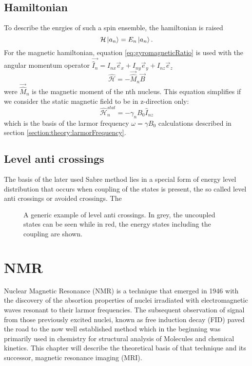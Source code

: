         \subsection{Hamiltonian}
            To describe the enrgies of such a spin ensemble, the hamiltonian is raised
            \begin{equation*}
                \mathcal{H}\ket{a_n} = E_n \ket{a_n}.
            \end{equation*}
        For the magnetic hamiltonian, equation \ref{eq:gyromagneticRatio} is used with the angular momentum operator $\vec{\hat I_n} = I_{nx}\vec e_x + I_{ny}\vec e_y + I_{nz}\vec e_z$
            \begin{equation}
                \mathcal{\hat H} = - \vec{\hat M}_n \vec B
            \end{equation}
            were $\vec{\hat M}_n$ is the magnetic moment of the nth nucleus. This equation simplifies if we consider the static magnetic field to be in z-direction only:
            \begin{equation}
                \mathcal{\hat H}_n^{stat} = - \gamma_n B_0 \hat{I}_{nz}
            \end{equation}
            which is the basis of the larmor frequency $\omega = \gamma B_0$ calculations described in section \ref{section:theory:larmorFrequency}.
            

        \subsection{Level anti crossings}
            The basis of the later used Sabre method lies in a special form of energy level distribution that occurs when coupling of the states is present, the so called level anti crossings or avoided crossings. The 
            \begin{figure}
                \caption[Leval anti crossings]{A generic example of level anti crossings. In grey, the uncoupled states can be seen while in red, the energy states including the coupling are shown.}
            \end{figure}
    \section{NMR}
        Nuclear Magnetic Resonance (NMR) is a technique that emerged in 1946 with the discovery
        of the absortion properties of nuclei irradiated with electromagnetic waves resonant to their
        larmor frequencies.\cite{ResonanceAbsorption} The subsequent observation of signal from those
        previously excited nuclei, known as free induction decay (FID) paved the road to the now well
        established method which in the beginning was primarily used in chemistry for structural
        analysis of Molecules and chemical kinetics. This chapter will describe the theoretical basis of that technique and its successor, magnetic resonance imaging (MRI).
